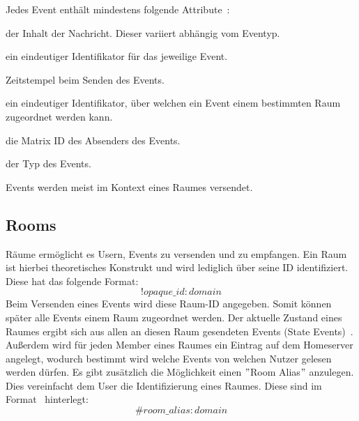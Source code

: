     Jedes Event enthält mindestens folgende Attribute~\cite{eventformat}:
    \begin{description}[leftmargin=!,labelwidth=3.5cm]
        \item [content] der Inhalt der Nachricht. Dieser variiert abhängig vom Eventyp.
        \item [event\_id] ein eindeutiger Identifikator für das jeweilige Event.
        \item [origin\_server\_ts] Zeitstempel beim Senden des Events.
        \item [room\_id] ein eindeutiger Identifikator, über welchen ein Event einem bestimmten Raum zugeordnet werden kann.
        \item [sender] die Matrix ID des Absenders des Events.
        \item [type] der Typ des Events.
    \end{description}

    Events werden meist im Kontext eines Raumes versendet.

    \newpage
    \subsection{Rooms}\label{subsec:rooms}
    Räume ermöglicht es Usern, Events zu versenden und zu empfangen.
    Ein Raum ist hierbei theoretisches Konstrukt und wird lediglich über seine ID identifiziert.
    Diese hat das folgende Format:
    \begin{displaymath}
        !opaque\_id:domain
    \end{displaymath}
    Beim Versenden eines Events wird diese Raum-ID angegeben.
    Somit können später alle Events einem Raum zugeordnet werden.
    Der aktuelle Zustand eines Raumes ergibt sich aus allen an diesen Raum gesendeten Events (State Events)~\cite{rooms}.
    Außerdem wird für jeden Member eines Raumes ein Eintrag auf dem Homeserver angelegt, wodurch bestimmt wird welche Events von welchen Nutzer gelesen werden dürfen.
    Es gibt zusätzlich die Möglichkeit einen \("\)Room Alias\("\) anzulegen.
    Dies vereinfacht dem User die Identifizierung eines Raumes.
    Diese sind im Format~\cite{rooms} hinterlegt:
    \begin{displaymath}
        \#room\_alias:domain
    \end{displaymath}


